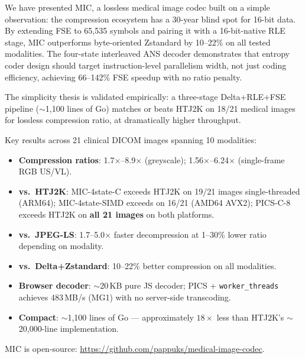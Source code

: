 \documentclass[10pt,twocolumn]{article}
\begin{document}
We have presented MIC, a lossless medical image codec built on a simple
observation: the compression ecosystem has a 30-year blind spot for 16-bit data.
By extending FSE to 65,535 symbols and pairing it with a 16-bit-native RLE
stage, MIC outperforms byte-oriented Zstandard by 10--22\% on all tested
modalities. The four-state interleaved ANS decoder demonstrates that entropy
coder design should target instruction-level parallelism width, not just coding
efficiency, achieving 66--142\% FSE speedup with no ratio penalty.

The simplicity thesis is validated empirically: a three-stage Delta+RLE+FSE
pipeline ($\sim$1,100 lines of Go) matches or beats HTJ2K on 18/21 medical
images for lossless compression ratio, at dramatically higher throughput.

Key results across 21 clinical DICOM images spanning 10 modalities:
\begin{itemize}
  \item \textbf{Compression ratios}: 1.7$\times$--8.9$\times$ (greyscale);
  1.56$\times$--6.24$\times$ (single-frame RGB US/VL).
  \item \textbf{vs.\ HTJ2K}: MIC-4state-C exceeds HTJ2K on 19/21 images
  single-threaded (ARM64); MIC-4state-SIMD exceeds on 16/21 (AMD64 AVX2);
  PICS-C-8 exceeds HTJ2K on \textbf{all 21 images} on both platforms.
  \item \textbf{vs.\ JPEG-LS}: 1.7--5.0$\times$ faster decompression at 1--30\%
  lower ratio depending on modality.
  \item \textbf{vs.\ Delta+Zstandard}: 10--22\% better compression on all
  modalities.
  \item \textbf{Browser decoder}: $\sim$20\,KB pure JS decoder; PICS +
  \texttt{worker\_threads} achieves 483\,MB/s (MG1) with no server-side
  transcoding.
  \item \textbf{Compact}: $\sim$1,100 lines of Go --- approximately $18\times$
  less than HTJ2K's $\sim$20,000-line implementation.
\end{itemize}

MIC is open-source: \url{https://github.com/pappuks/medical-image-codec}.
\end{document}
